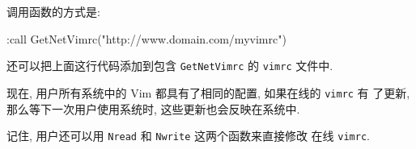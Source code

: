 调用函数的方式是:
\begin{vimcode}
:call GetNetVimrc("http://www.domain.com/myvimrc")
\end{vimcode}
还可以把上面这行代码添加到包含 \texttt{GetNetVimrc} 的 \texttt{vimrc} 文件中.

现在, 用户所有系统中的 Vim 都具有了相同的配置, 如果在线的 \texttt{vimrc} 有
了更新, 那么等下一次用户使用系统时, 这些更新也会反映在系统中.

记住, 用户还可以用 \texttt{Nread} 和 \texttt{Nwrite} 这两个函数来直接修改
在线 \texttt{vimrc}.

